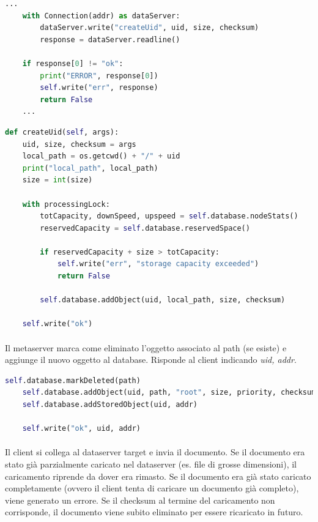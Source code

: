 \documentclass[11pt,a4paper,english]{article}
\begin{document}
\begin{lstlisting}[language=Python, title=Metaserver]
    ...
    with Connection(addr) as dataServer:
        dataServer.write("createUid", uid, size, checksum)
        response = dataServer.readline()

    if response[0] != "ok":
        print("ERROR", response[0])
        self.write("err", response)
        return False
    ...
\end{lstlisting}

\begin{lstlisting}[language=Python, title=Dataserver]
def createUid(self, args):
	uid, size, checksum = args
	local_path = os.getcwd() + "/" + uid
	print("local_path", local_path)
	size = int(size)
	
	with processingLock:
		totCapacity, downSpeed, upspeed = self.database.nodeStats()
		reservedCapacity = self.database.reservedSpace()
		
		if reservedCapacity + size > totCapacity:
			self.write("err", "storage capacity exceeded")
			return False
		
		self.database.addObject(uid, local_path, size, checksum)
		
	self.write("ok")
\end{lstlisting}

\paragraph{} Il metaserver marca come eliminato l'oggetto associato al path (se esiste) e aggiunge il nuovo oggetto al database. Risponde al client indicando \emph{uid, addr}. 

\begin{lstlisting}[language=Python, title=Metaserver]
    self.database.markDeleted(path)
    self.database.addObject(uid, path, "root", size, priority, checksum)
    self.database.addStoredObject(uid, addr)

    self.write("ok", uid, addr)
\end{lstlisting}

\paragraph{} Il client si collega al dataserver target e invia il documento. Se il documento era stato già parzialmente caricato nel dataserver (es. file di grosse dimensioni), il caricamento riprende da dover era rimasto. Se il documento era già stato caricato completamente (ovvero il client tenta di caricare un documento già completo), viene generato un errore. Se il checksum al termine del caricamento non corrisponde, il documento viene subito eliminato per essere ricaricato in futuro. 
\end{document}
